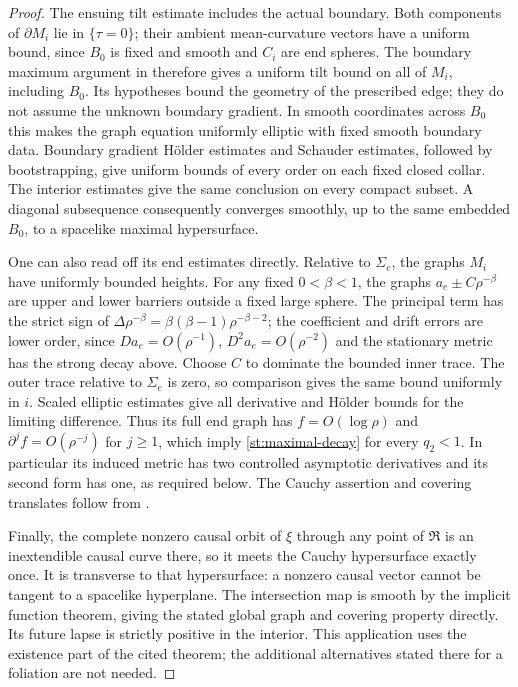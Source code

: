 \begin{proof}
The ensuing tilt estimate includes the actual boundary.  Both
components of $\partial M_i$ lie in $\{\tau=0\}$; their ambient
mean-curvature vectors have a uniform bound, since $B_0$ is fixed
and smooth and $C_i$ are end spheres.  The boundary maximum
argument in \cite[Theorem~3.1(iii), Equations~(3.10)--(3.12)]{Bartnik1984}
therefore gives a uniform tilt bound on all of $M_i$, including
$B_0$.  Its hypotheses bound the geometry of the prescribed edge;
they do not assume the unknown boundary gradient.  In smooth
coordinates across $B_0$ this makes the graph equation uniformly
elliptic with fixed smooth boundary data.  Boundary gradient
H\"older estimates and Schauder estimates, followed by
bootstrapping, give uniform bounds of every order on each fixed
closed collar.  The interior estimates give the same conclusion
on every compact subset.  A diagonal subsequence consequently
converges smoothly, up to the same embedded $B_0$, to a spacelike
maximal hypersurface.

One can also read off its end estimates directly.  Relative to
$\Sigma_e$, the graphs $M_i$ have uniformly bounded heights.
For any fixed $0<\beta<1$, the graphs
$a_e\pm C\rho^{-\beta}$ are upper and lower barriers outside a
fixed large sphere.  The principal term has the strict sign of
$\Delta\rho^{-\beta}=\beta(\beta-1)\rho^{-\beta-2}$;
the coefficient and drift errors are lower order, since
$Da_e=O(\rho^{-1})$, $D^2a_e=O(\rho^{-2})$ and the stationary
metric has the strong decay above.  Choose $C$ to dominate the
bounded inner trace.  The outer trace relative to $\Sigma_e$ is
zero, so comparison gives the same bound uniformly in $i$.
Scaled elliptic estimates give all derivative and H\"older bounds
for the limiting difference.  Thus its full end graph has
$f=O(\log\rho)$ and $\partial^j f=O(\rho^{-j})$ for $j\geq1$,
which imply \eqref{st:maximal-decay} for every $q_2<1$.
In particular its induced metric has two controlled asymptotic
derivatives and its second form has one, as required below.
The Cauchy assertion and covering translates follow from
\cite[Lemma~4.2 and Theorem~4.2]{ChruscielWald1994}.

Finally, the complete nonzero causal orbit of $\xi$ through any
point of $\mathfrak R$ is an inextendible causal curve there, so it
meets the Cauchy hypersurface exactly once.  It is transverse to
that hypersurface: a nonzero causal vector cannot be tangent to a
spacelike hyperplane.  The intersection map is smooth by the
implicit function theorem, giving the stated global graph and
covering property directly.  Its future lapse is strictly positive in the interior.
This application uses the existence part of the cited theorem;
the additional alternatives stated there for a foliation are not
needed.
\end{proof}

